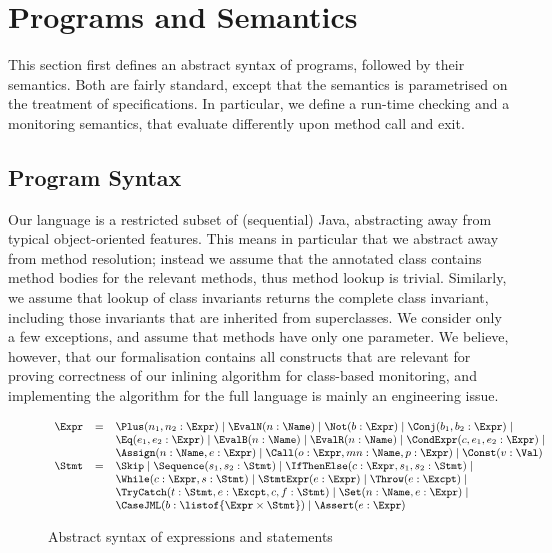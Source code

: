 

\section{Programs and Semantics}\label{SecProgram}

This section first defines an abstract syntax of programs, followed by
their semantics. Both are fairly standard, except that the semantics
is parametrised on the treatment of specifications. In particular, we
define a run-time checking and a monitoring semantics, that evaluate
differently upon method call and exit.


\subsection{Program Syntax}\label{SecSyntax}
Our language is a restricted subset of (sequential) Java, abstracting
away from typical object-oriented features. This means in particular
that we abstract away from method resolution; instead we assume that
the annotated class contains method bodies for the relevant methods,
thus method lookup is trivial. Similarly, we assume that lookup of
class invariants returns the complete class invariant, including those
invariants that are inherited from superclasses. We consider
only a few exceptions, and assume that methods have only one
parameter. We believe, however, that our formalisation contains all
constructs that are relevant for proving correctness of our inlining
algorithm for class-based monitoring, and implementing the
algorithm for the full language is mainly an engineering issue.

\begin{figure}[t]
\[{\small
\begin{array}{rcl}
\Expr & = & \Plus(n_1, n_2 : \Expr) \mid
            \EvalN(n : \Name) \mid
            \Not(b : \Expr) \mid
            \Conj(b_1, b_2 : \Expr) \mid \\
      &   & \Eq(e_1, e_2 : \Expr) \mid
            \EvalB(n : \Name) \mid
            \EvalR(n : \Name) \mid
            \CondExpr(c, e_1, e_2 : \Expr) \mid\\
      &   & \Assign(n : \Name, e : \Expr) \mid
            \Call(o : \Expr, mn : \Name, p : \Expr) \mid
            \Const(v : \Val) \\
\Stmt & = & \Skip \mid
            \Sequence(s_1, s_2 : \Stmt) \mid
            \IfThenElse(c : \Expr, s_1, s_2 : \Stmt) \mid\\
      &   & \While(c : \Expr, s : \Stmt) \mid
            \StmtExpr(e : \Expr) \mid
            \Throw(e : \Excpt) \mid\\
      &   & \TryCatch(t: \Stmt, e : \Excpt, c, f : \Stmt) \mid
            \Set(n : \Name, e : \Expr) \mid\\
      &   & \CaseJML(b : \listof{\Expr \times \Stmt}) \mid
            \Assert(e : \Expr)
\end{array}}
\]
\caption{Abstract syntax of expressions and statements}
\label{FigExprStmt}
\end{figure}

